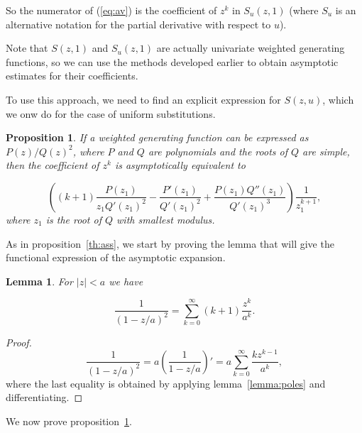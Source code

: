 \documentclass{article}
\newtheorem{lemma}{Lemma}
\newtheorem{proposition}{Proposition}
\begin{document}
So the numerator of (\ref{eq:av}) is the coefficient of $z^k$ in
$S_u(z,1)$ (where $S_u$ is an alternative notation for the partial
derivative with respect to $u$).

Note that $S(z,1)$ and $S_u(z,1)$ are
actually univariate weighted generating functions, so we can use the
methods developed earlier to obtain asymptotic estimates for their
coefficients.

To use this approach, we need to find an explicit expression for $S(z,u)$,
which we onw do for the case of uniform substitutions.





\begin{proposition}
\label{th:ass2}
If a weighted generating function can be expressed as $P(z)/Q(z)^2$, where
$P$ and $Q$ are polynomials and the roots of $Q$ are simple, then the
coefficient of $z^k$ is asymptotically equivalent to

\begin{equation}
\label{eq:ass2}
\left( (k+1)\frac{P(z_1)}{z_1 Q'(z_1)^2} - \frac{P'(z_1)}{Q'(z_1)^2} +
\frac{P(z_1)Q''(z_1)}{Q'(z_1)^3} \right)
\frac{1}{z_1^{k+1}},
\end{equation}
where $z_1$ is the root of $Q$ with smallest \textit{modulus}.
\end{proposition}

As in proposition~\ref{th:ass}, we start by proving the lemma that will
give the functional expression of the asymptotic expansion.

\begin{lemma}
\label{lemma:poles2}
For $|z| < a$ we have

\begin{equation}
\label{eq:poles2}
\frac{1}{(1-z/a)^2} = \sum_{k=0}^\infty (k+1)\frac{z^k}{a^k}.
\end{equation}
\end{lemma}

\begin{proof}
\begin{equation*}
\frac{1}{(1-z/a)^2} = a \left( \frac{1}{1-z/a} \right)'
= a \sum_{k=0}^\infty \frac{kz^{k-1}}{a^k},
\end{equation*}
where the last equality is obtained by applying lemma~\ref{lemma:poles}
and differentiating.
\end{proof}

We now prove proposition~\ref{th:ass2}.
\end{document}
